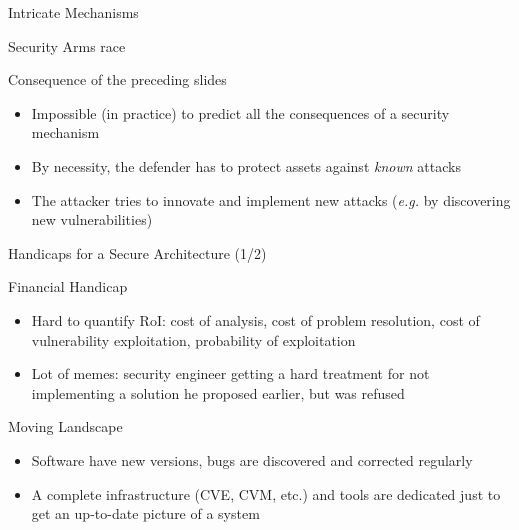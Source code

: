 \begin{reveals}
\begin{frame}[c]{Intricate Mechanisms}
\end{frame}

\begin{frame}[c]{Security Arms race}
  
  \begin{block}{Consequence of the preceding slides}
    \begin{itemize}
    \item Impossible (in practice) to predict all the consequences of a security mechanism
    \item By necessity, the defender has to protect assets against \emph{known} attacks
    \item The attacker tries to innovate and implement new attacks
      (\emph{e.g.} by discovering new vulnerabilities)
    \end{itemize}
  \end{block}

\end{frame}

\begin{frame}[c]{Handicaps for a Secure Architecture (1/2)}
  
  \begin{block}{Financial Handicap}
    \begin{itemize}
    \item Hard to quantify RoI: cost of analysis, cost of problem
      resolution, cost of vulnerability exploitation, probability of
      exploitation
    \item Lot of memes: security engineer getting a hard treatment for
      not implementing a solution he proposed earlier, but was refused
    \end{itemize}
  \end{block}

  \pause\vfill

  \begin{block}{Moving Landscape}
    \begin{itemize}
    \item Software have new versions, bugs are discovered and corrected regularly
    \item A complete infrastructure (CVE, CVM, etc.) and tools are
      dedicated just to get an up-to-date picture of a system
    \end{itemize}
  \end{block}

\end{frame}


\end{reveals}
